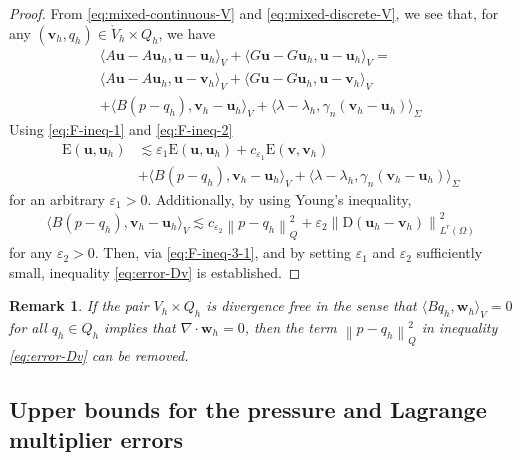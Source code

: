 \documentclass[onefignum,onetabnum]{siamart190516}
\newcommand{\bu}{\boldsymbol{u}}
\newcommand{\bv}{\boldsymbol{v}}
\newcommand{\bw}{\boldsymbol{w}}
\newcommand{\bD}{\boldsymbol{\mathrm{D}}}
\newcommand{\bE}{\mathrm{E}}
\newcommand{\nrm}[1]{\left\lVert#1\right\rVert}
\newcommand{\Vo}{\mathring{V}}
\newtheorem{remark}[theorem]{Remark}
\begin{document}
	\begin{proof}
		From \eqref{eq:mixed-continuous-V} and \eqref{eq:mixed-discrete-V}, we see that, for any $(\bv_h,q_h)\in\Vo_h\times Q_h$, we have
		\begin{equation*}
			\begin{split}
				\langle A\bu - A\bu_h, \bu - \bu_h \rangle_V + \langle G\bu - G\bu_h, \bu - \bu_h \rangle_V = \\
				\langle A\bu - A\bu_h, \bu - \bv_h \rangle_V + \langle G\bu - G\bu_h, \bu - \bv_h \rangle_V \\
				+ \langle B(p - q_h), \bv_h - \bu_h \rangle_V + \langle \lambda - \lambda_h, \gamma_n(\bv_h - \bu_h) \rangle_\Sigma
			\end{split}
		\end{equation*}		
		Using \eqref{eq:F-ineq-1} and \eqref{eq:F-ineq-2}
		\begin{equation*}
			\begin{split}
				\bE(\bu,\bu_h) &\lesssim \varepsilon_1 \bE(\bu,\bu_h) + c_{\varepsilon_1} \bE(\bv,\bv_h) \\
				&+ \langle B(p - q_h), \bv_h - \bu_h \rangle_V + \langle \lambda - \lambda_h, \gamma_n(\bv_h - \bu_h) \rangle_\Sigma
			\end{split}
		\end{equation*}
		for an arbitrary $\varepsilon_1 > 0$. Additionally, by using Young's inequality,
		\begin{align*}
			\langle B(p - q_h), \bv_h - \bu_h \rangle_V \lesssim c_{\varepsilon_2} \nrm{p - q_h}^2_Q + \varepsilon_2 \nrm{\bD(\bu_h - \bv_h)}^2_{L^r(\Omega)}
		\end{align*}
		for any $\varepsilon_2 > 0$. Then, via \eqref{eq:F-ineq-3-1}, and by setting $\varepsilon_1$ and $\varepsilon_2$ sufficiently small, inequality \eqref{eq:error-Dv} is established.
	\end{proof}

	\begin{remark}
		If the pair $V_h\times Q_h$ is divergence free in the sense that $\langle Bq_h, \bw_h\rangle_V= 0$ for all $q_h\in Q_h$ implies that $\nabla\cdot \bw_h = 0$, then the term $\nrm{p - q_h}^2_Q$ in inequality \eqref{eq:error-Dv} can be removed.
	\end{remark}
	
	
\subsection{Upper bounds for the pressure and Lagrange multiplier errors}
\end{document}
